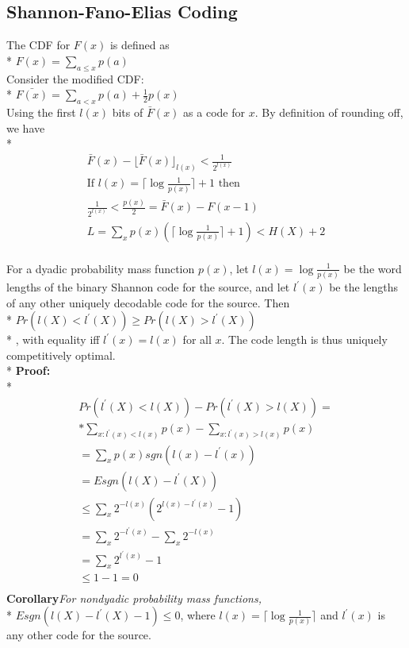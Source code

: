 \documentclass[10pt]{article}
\begin{document}
\begin{tiny}
\begin{multicols}{3}
\section*{Shannon-Fano-Elias Coding}
The CDF for ${F(x)}$ is defined as \\* $F(x) = \sum_{a\leq x}p(a)$\\
Consider the modified CDF: \\* $\bar{ F(x)} = \sum_{a < x}p(a) + \frac{1}{2} p(x)$\\
Using the first $l(x)$ bits of $\bar{F}(x)$ as a code for $x$. By definition of rounding off, we have \\*
\begin{eqnarray}
\bar{F}(x) - {\lfloor \bar{F}(x) \rfloor}_{l(x)} < \frac{1}{2^{l(x)}}\\
\text{If } l(x) = \lceil \log \frac{1}{p(x)} \rceil + 1 \text{ then } \\
\frac {1}{2^{l(x)}} < \frac {p(x)}{2} =  \bar{F}(x) - F(x-1)\\
L= \sum_x p(x) (\lceil \log \frac {1}{p(x)} \rceil + 1) < H(X) + 2\\
\end{eqnarray}

 \label{thm: dyadic}
For a dyadic probability mass function $p(x)$, let $l(x) = \log \frac{1}{p(x)}$ be the word lengths of the binary Shannon code for the source, and let $l^{'}(x)$ be the lengths of any other uniquely decodable code for the source. Then \\*
$Pr(l(X) < l^{'}(X)) \geq Pr(l(X) > l^{'}(X))$ \\*
, with equality iff $l^{'}(x) = l(x)$ for all $x$. The code length is thus uniquely competitively optimal.\\*
{\bf Proof: } \\*
\begin{eqnarray}
Pr(l^{'}(X) < l(X)) - Pr(l^{'}(X) > l(X)) = \\*
\sum_{x:l^{'}(x)<l(x)} p(x) - \sum_{x:l^{'}(x)>l(x)} p(x)\\
=\sum_x p(x)sgn(l(x) - l^{'}(x))\\
=E sgn(l(X) - l^{'}(X)) \\
\leq \sum_x 2^{-l(x)} (2^{l(x)-l^{'}(x)} - 1)\\
=\sum_x 2^{-l^{'}(x)} - \sum_x 2^{-l(x)}\\
=\sum_x 2^{l^{'}(x)} - 1\\
\leq 1-1 = 0\\
\end{eqnarray}
{\bf Corollary}{\it For nondyadic probability mass functions, }\\*
$E sgn(l(X) - l^{'}(X) - 1) \leq 0$, where $l(x) = \lceil \log \frac {1}{p(x)} \rceil$ and $l^{'}(x)$ is any other code for the source.


\end{multicols}
\end{tiny}
\end{document}
